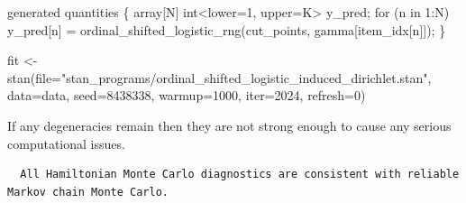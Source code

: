 \documentclass[
  letterpaper,
  DIV=11,
  numbers=noendperiod]{scrartcl}
\newenvironment{Shaded}{\begin{snugshade}}{\end{snugshade}}
\newcommand{\AttributeTok}[1]{\textcolor[rgb]{0.40,0.45,0.13}{#1}}
\newcommand{\ControlFlowTok}[1]{\textcolor[rgb]{0.00,0.23,0.31}{#1}}
\newcommand{\DataTypeTok}[1]{\textcolor[rgb]{0.68,0.00,0.00}{#1}}
\newcommand{\DecValTok}[1]{\textcolor[rgb]{0.68,0.00,0.00}{#1}}
\newcommand{\FunctionTok}[1]{\textcolor[rgb]{0.28,0.35,0.67}{#1}}
\newcommand{\KeywordTok}[1]{\textcolor[rgb]{0.00,0.23,0.31}{#1}}
\newcommand{\NormalTok}[1]{\textcolor[rgb]{0.00,0.23,0.31}{#1}}
\newcommand{\OtherTok}[1]{\textcolor[rgb]{0.00,0.23,0.31}{#1}}
\newcommand{\SpecialCharTok}[1]{\textcolor[rgb]{0.37,0.37,0.37}{#1}}
\newcommand{\StringTok}[1]{\textcolor[rgb]{0.13,0.47,0.30}{#1}}
\begin{document}
\begin{codelisting}
\begin{Shaded}
\begin{Highlighting}[]
\KeywordTok{generated quantities}\NormalTok{ \{}
  \DataTypeTok{array}\NormalTok{[N] }\DataTypeTok{int}\NormalTok{\textless{}}\KeywordTok{lower}\NormalTok{=}\DecValTok{1}\NormalTok{, }\KeywordTok{upper}\NormalTok{=K\textgreater{} y\_pred;}
  \ControlFlowTok{for}\NormalTok{ (n }\ControlFlowTok{in} \DecValTok{1}\NormalTok{:N)}
\NormalTok{    y\_pred[n] = ordinal\_shifted\_logistic\_rng(cut\_points,}
\NormalTok{                                             gamma[item\_idx[n]]);}
\NormalTok{\}}
\end{Highlighting}
\end{Shaded}

\end{codelisting}

\begin{Shaded}
\begin{Highlighting}[]
\NormalTok{fit }\OtherTok{\textless{}{-}} \FunctionTok{stan}\NormalTok{(}\AttributeTok{file=}\StringTok{"stan\_programs/ordinal\_shifted\_logistic\_induced\_dirichlet.stan"}\NormalTok{,}
            \AttributeTok{data=}\NormalTok{data, }\AttributeTok{seed=}\DecValTok{8438338}\NormalTok{,}
            \AttributeTok{warmup=}\DecValTok{1000}\NormalTok{, }\AttributeTok{iter=}\DecValTok{2024}\NormalTok{, }\AttributeTok{refresh=}\DecValTok{0}\NormalTok{)}
\end{Highlighting}
\end{Shaded}

If any degeneracies remain then they are not strong enough to cause any
serious computational issues.

\begin{Shaded}
\end{Shaded}

\begin{verbatim}
  All Hamiltonian Monte Carlo diagnostics are consistent with reliable
Markov chain Monte Carlo.
\end{verbatim}
\end{document}
